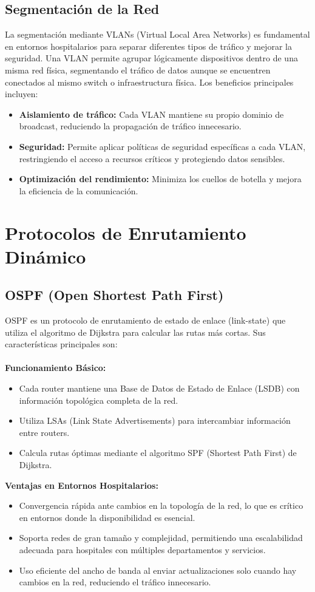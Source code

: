 \subsection{Segmentación de la Red}
La segmentación mediante VLANs (Virtual Local Area Networks) es fundamental en entornos hospitalarios para separar diferentes tipos de tráfico y mejorar la seguridad. 
Una VLAN permite agrupar lógicamente dispositivos dentro de una misma red física, segmentando el tráfico de datos aunque se encuentren conectados al mismo switch o 
infraestructura física. Los beneficios principales incluyen:
\begin{itemize}
    \item \textbf{Aislamiento de tráfico:} Cada VLAN mantiene su propio dominio de broadcast, reduciendo la propagación de tráfico innecesario.
    \item \textbf{Seguridad:} Permite aplicar políticas de seguridad específicas a cada VLAN, restringiendo el acceso a recursos críticos y protegiendo datos sensibles.
    \item \textbf{Optimización del rendimiento:} Minimiza los cuellos de botella y mejora la eficiencia de la comunicación.
\end{itemize}

\section{Protocolos de Enrutamiento Dinámico}
\subsection{OSPF (Open Shortest Path First)}
\label{subsec:ospf}
OSPF es un protocolo de enrutamiento de estado de enlace (link-state) que utiliza el algoritmo de Dijkstra para calcular las rutas más cortas. Sus características principales son:
\\ \\
\textbf{Funcionamiento Básico:}
\begin{itemize}
    \item Cada router mantiene una Base de Datos de Estado de Enlace (LSDB) con información topológica completa de la red.
    \item Utiliza LSAs (Link State Advertisements) para intercambiar información entre routers.
    \item Calcula rutas óptimas mediante el algoritmo SPF (Shortest Path First) de Dijkstra.
\end{itemize}
\textbf{Ventajas en Entornos Hospitalarios:}
\begin{itemize}
    \item Convergencia rápida ante cambios en la topología de la red, lo que es crítico en entornos donde la disponibilidad es esencial.
    \item Soporta redes de gran tamaño y complejidad, permitiendo una escalabilidad adecuada para hospitales con múltiples departamentos y servicios.
    \item Uso eficiente del ancho de banda al enviar actualizaciones solo cuando hay cambios en la red, reduciendo el tráfico innecesario.
\end{itemize}

